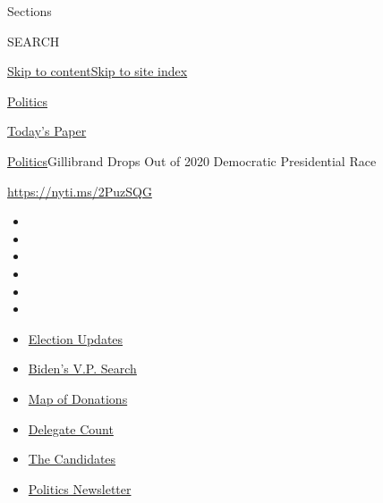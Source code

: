 Sections

SEARCH

\protect\hyperlink{site-content}{Skip to
content}\protect\hyperlink{site-index}{Skip to site index}

\href{https://www.nytimes.com/section/politics}{Politics}

\href{https://myaccount.nytimes.com/auth/login?response_type=cookie\&client_id=vi}{}

\href{https://www.nytimes.com/section/todayspaper}{Today's Paper}

\href{/section/politics}{Politics}\textbar{}Gillibrand Drops Out of 2020
Democratic Presidential Race

\url{https://nyti.ms/2PuzSQG}

\begin{itemize}
\item
\item
\item
\item
\item
\item
\end{itemize}

\begin{itemize}
\item
  \href{https://www.nytimes.com/2020/07/31/us/elections/biden-vs-trump.html?action=click\&pgtype=Article\&state=default\&region=TOP_BANNER\&context=storylines_menu}{Election
  Updates}
\item
  \href{https://www.nytimes.com/article/biden-vice-president-2020.html?action=click\&pgtype=Article\&state=default\&region=TOP_BANNER\&context=storylines_menu}{Biden's
  V.P. Search}
\item
  \href{https://www.nytimes.com/interactive/2020/07/24/us/politics/trump-biden-campaign-donors.html?action=click\&pgtype=Article\&state=default\&region=TOP_BANNER\&context=storylines_menu}{Map
  of Donations}
\item
  \href{https://www.nytimes.com/interactive/2020/us/elections/delegate-count-primary-results.html?action=click\&pgtype=Article\&state=default\&region=TOP_BANNER\&context=storylines_menu}{Delegate
  Count}
\item
  \href{https://www.nytimes.com/interactive/2019/us/politics/2020-presidential-candidates.html?action=click\&pgtype=Article\&state=default\&region=TOP_BANNER\&context=storylines_menu}{The
  Candidates}
\item
  \href{https://www.nytimes.com/newsletters/politics?action=click\&pgtype=Article\&state=default\&region=TOP_BANNER\&context=storylines_menu}{Politics
  Newsletter}
\end{itemize}

